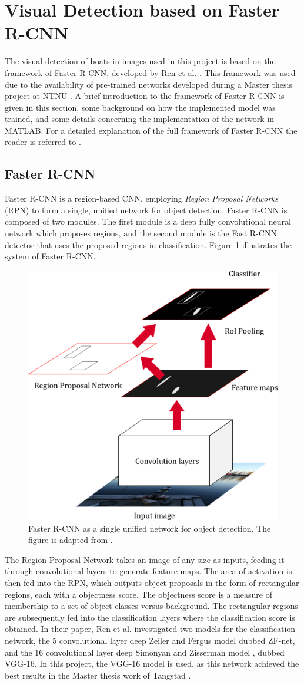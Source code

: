 \section{Visual Detection based on Faster R-CNN}
The visual detection of boats in images used in this project is based on the framework of Faster R-CNN, developed by Ren et al. \cite{ren15fasterrcnn}. This framework was used due to the availability of pre-trained networks developed during a Master thesis project at NTNU \cite{tangstad}. A brief introduction to the framework of Faster R-CNN is given in this section, some background on how the implemented model was trained, and some details concerning the implementation of the network in MATLAB. For a detailed explanation of the full framework of Faster R-CNN the reader is referred to \cite{ren15fasterrcnn}.
\subsection{Faster R-CNN}
Faster R-CNN is a region-based CNN, employing \textit{Region Proposal Networks} (RPN) to form a single, unified network for object detection. Faster R-CNN is composed of two modules. The first module is a deep fully convolutional neural network which proposes regions, and the second module is the Fast R-CNN detector \cite{Girshick_2015_ICCV} that uses the proposed regions in classification. Figure \ref{fig:faster_r_cnn} illustrates the system of Faster R-CNN.
\begin{figure}
	\centering
	\includegraphics[width=0.5\linewidth]{fig/faster_r_cnn_layers.png}
	\caption{Faster R-CNN as a single unified network for object detection. The figure is adapted from \cite{ren15fasterrcnn}.}
	\label{fig:faster_r_cnn}
\end{figure}
The Region Proposal Network takes an image of any size as inputs, feeding it through convolutional layers to generate feature maps. The area of activation is then fed into the RPN, which outputs object proposals in the form of rectangular regions, each with a objectness score. The objectness score is a measure of membership to a set of object classes versus background. The rectangular regions are subsequently fed into the classification layers where the classification score is obtained. In their paper, Ren et al. investigated two models for the classification network, the 5 convolutional layer deep Zeiler and Fergus model \cite{Zeiler2014} dubbed ZF-net, and the 16 convolutional layer deep Simonyan and Zisserman model \cite{VGG16}, dubbed VGG-16. In this project, the VGG-16 model is used, as this network achieved the best results in the Master thesis work of Tangstad \cite{tangstad}.
